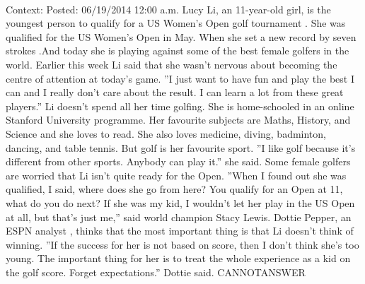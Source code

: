 \documentclass[11pt,a4paper, onecolumn]{article}
\begin{document}
\\ Context: Posted: 06/19/2014 12:00 a.m. Lucy Li, an 11-year-old girl, is the youngest person to qualify for a US Women's Open golf tournament . She was qualified for the US Women's Open in May. When she set a new record by seven strokes .And today she is playing against some of the best female golfers in the world. Earlier this week Li said that she wasn't nervous about becoming the centre of attention at today's game. ''I just want to have fun and play the best I can and I really don't care about the result. I can learn a lot from these great players.'' Li doesn't spend all her time golfing. She is home-schooled in an online Stanford University programme. Her favourite subjects are Maths, History, and Science and she loves to read. She also loves medicine, diving, badminton, dancing, and table tennis. But golf is her favourite sport. ''I like golf because it's different from other sports. Anybody can play it.'' she said. Some female golfers are worried that Li isn't quite ready for the Open. ''When I found out she was qualified, I said, where does she go from here? You qualify for an Open at 11, what do you do next? If she was my kid, I wouldn't let her play in the US Open at all, but that's just me,'' said world champion Stacy Lewis. Dottie Pepper, an ESPN analyst , thinks that the most important thing is that Li doesn't think of winning. ''If the success for her is not based on score, then I don't think she's too young. The important thing for her is to treat the whole experience as a kid on the golf score. Forget expectations.'' Dottie said. CANNOTANSWER
\end{document}
